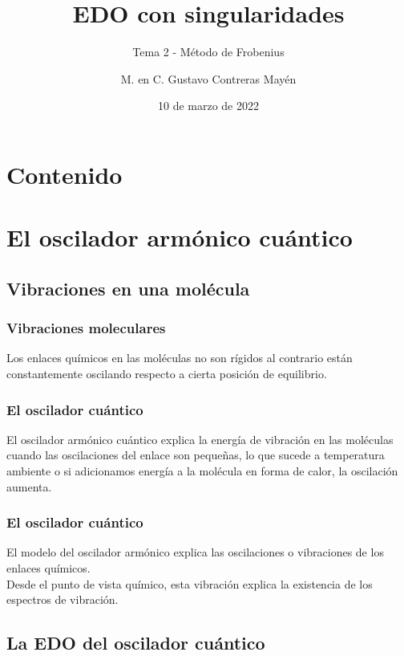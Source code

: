 \documentclass[12pt]{beamer}
\date{10 de marzo de 2022}
\title{\large{EDO con singularidades}}
\subtitle{Tema 2 - Método de Frobenius}
\author{M. en C. Gustavo Contreras Mayén}
\begin{document}
\maketitle
\fontsize{14}{14}\selectfont
{}

\section*{Contenido}

\section{El oscilador armónico cuántico}
\subsection{Vibraciones en una molécula}

\begin{frame}
\frametitle{Vibraciones moleculares}
Los enlaces químicos en las moléculas no son rígidos al contrario están constantemente oscilando respecto a cierta posición de equilibrio.
\end{frame}
\begin{frame}
\frametitle{El oscilador cuántico}
El oscilador armónico cuántico explica la energía de vibración en las moléculas cuando las oscilaciones del enlace son pequeñas, lo que sucede a temperatura ambiente o si adicionamos energía a la molécula en forma de calor, la oscilación aumenta.
\end{frame}
\begin{frame}
\frametitle{El oscilador cuántico}
El modelo del oscilador armónico explica las oscilaciones o vibraciones de los enlaces químicos.
\\
\bigskip
\pause
Desde el punto de vista químico, esta vibración explica la existencia de los espectros de vibración.
\end{frame}

\subsection{La EDO del oscilador cuántico}
\end{document}
